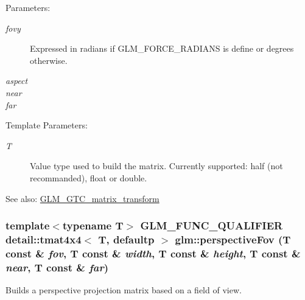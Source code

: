 \begin{Desc}
\item[Parameters:]
\begin{description}
\item[{\em fovy}]Expressed in radians if GLM\_\-FORCE\_\-RADIANS is define or degrees otherwise. \item[{\em aspect}]\item[{\em near}]\item[{\em far}]\end{description}
\end{Desc}
\begin{Desc}
\item[Template Parameters:]
\begin{description}
\item[{\em T}]Value type used to build the matrix. Currently supported: half (not recommanded), float or double. \end{description}
\end{Desc}
\begin{Desc}
\item[See also:]\hyperlink{group__gtc__matrix__transform}{GLM\_\-GTC\_\-matrix\_\-transform} \end{Desc}
\hypertarget{group__gtc__matrix__transform_gc9db4ea8ecdcb00f1d06d29603b5df52}{
\subsubsection[perspectiveFov]{\setlength{\rightskip}{0pt plus 5cm}template$<$typename T$>$ GLM\_\-FUNC\_\-QUALIFIER detail::tmat4x4$<$ T, defaultp $>$ glm::perspectiveFov (T const \& {\em fov}, \/  T const \& {\em width}, \/  T const \& {\em height}, \/  T const \& {\em near}, \/  T const \& {\em far})}}
\label{group__gtc__matrix__transform_gc9db4ea8ecdcb00f1d06d29603b5df52}


Builds a perspective projection matrix based on a field of view.

